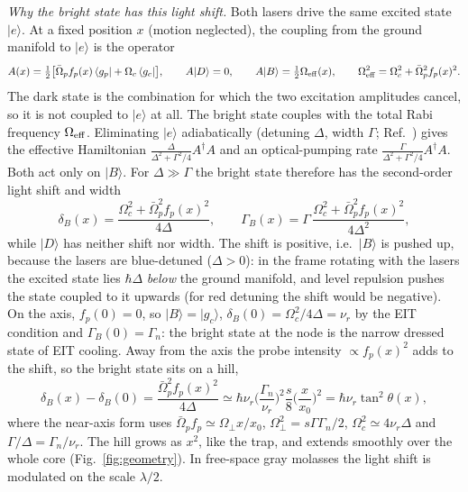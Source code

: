 \documentclass[11pt,a4paper]{article}
\newcommand{\ket}[1]{|#1\rangle}
\newcommand{\bra}[1]{\langle #1|}
\newcommand{\gc}{\ket{g_c}}
\newcommand{\Om}{\Omega}
\newcommand{\nur}{\nu_r}
\begin{document}
\emph{Why the bright state has this light shift.} Both lasers drive the same excited state $\ket e$. At a fixed position $x$ (motion neglected), the coupling from the ground manifold to $\ket e$ is the operator
\begin{equation}
  A(x)=\tfrac12\big[\bar\Om_pf_p(x)\,\bra{g_p}+\Om_c\,\bra{g_c}\big],\qquad
  A\ket{D}=0,\qquad A\ket{B}=\tfrac12\Om_{\rm eff}(x),\qquad
  \Om_{\rm eff}^2=\Om_c^2+\bar\Om_p^2f_p(x)^2 .
\end{equation}
The dark state is the combination for which the two excitation amplitudes cancel, so it is not coupled to $\ket e$ at all. The bright state couples with the total Rabi frequency $\Om_{\rm eff}$. Eliminating $\ket e$ adiabatically (detuning $\Delta$, width $\Gamma$; Ref.~\cite{reiter2012}) gives the effective Hamiltonian $\frac{\Delta}{\Delta^2+\Gamma^2/4}A^\dagger A$ and an optical-pumping rate $\frac{\Gamma}{\Delta^2+\Gamma^2/4}A^\dagger A$. Both act only on $\ket B$. For $\Delta\gg\Gamma$ the bright state therefore has the second-order light shift and width
\begin{equation}
  \delta_B(x)=\frac{\Om_c^2+\bar\Om_p^2f_p(x)^2}{4\Delta},\qquad
  \Gamma_B(x)=\Gamma\,\frac{\Om_c^2+\bar\Om_p^2f_p(x)^2}{4\Delta^2},
  \label{eq:dB0}
\end{equation}
while $\ket D$ has neither shift nor width. The shift is positive, i.e.\ $\ket B$ is pushed up, because the lasers are blue-detuned ($\Delta>0$): in the frame rotating with the lasers the excited state lies $\hbar\Delta$ \emph{below} the ground manifold, and level repulsion pushes the state coupled to it upwards (for red detuning the shift would be negative). On the axis, $f_p(0)=0$, so $\ket B=\gc$, $\delta_B(0)=\Om_c^2/4\Delta=\nur$ by the EIT condition and $\Gamma_B(0)=\Gamma_n$: the bright state at the node is the narrow dressed state of EIT cooling. Away from the axis the probe intensity $\propto f_p(x)^2$ adds to the shift, so the bright state sits on a hill,
\begin{equation}
  \delta_B(x)-\delta_B(0)=\frac{\bar\Om_p^2f_p(x)^2}{4\Delta}\simeq\hbar\nur\Big(\frac{\Gamma_n}{\nur}\Big)^2\frac{s}{8}\Big(\frac{x}{x_0}\Big)^2
  =\hbar\nur\tan^2\theta(x),
  \label{eq:dB}
\end{equation}
where the near-axis form uses $\bar\Om_pf_p\simeq\Om_\perp x/x_0$, $\Om_\perp^2=s\Gamma\Gamma_n/2$, $\Om_c^2\simeq4\nur\Delta$ and $\Gamma/\Delta=\Gamma_n/\nur$.
The hill grows as $x^2$, like the trap, and extends smoothly over the whole core (Fig.~\ref{fig:geometry}). In free-space gray molasses the light shift is modulated on the scale $\lambda/2$.
\end{document}
